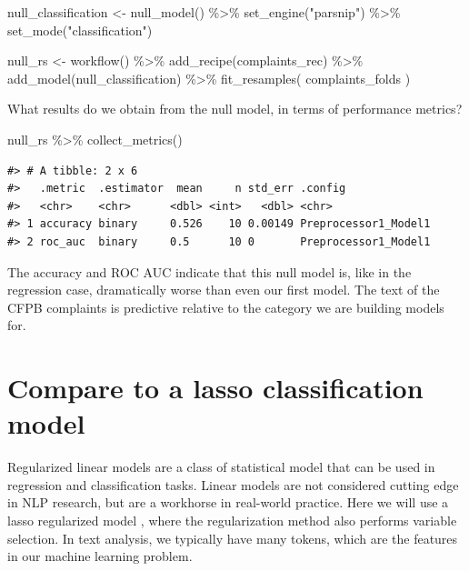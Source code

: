 \documentclass[
]{krantz}
\makeatletter
\newenvironment{Shaded}{\begin{snugshade}}{\end{snugshade}}
\newcommand{\FunctionTok}[1]{\textcolor[rgb]{0.00,0.00,0.00}{#1}}
\newcommand{\NormalTok}[1]{#1}
\newcommand{\OtherTok}[1]{\textcolor[rgb]{0.56,0.35,0.01}{#1}}
\newcommand{\SpecialCharTok}[1]{\textcolor[rgb]{0.00,0.00,0.00}{#1}}
\newcommand{\StringTok}[1]{\textcolor[rgb]{0.31,0.60,0.02}{#1}}
\newenvironment{kframe}{%
\medskip{}
\setlength{\fboxsep}{.8em}
 \def\at@end@of@kframe{}%
 \ifinner\ifhmode%
  \def\at@end@of@kframe{\end{minipage}}%
  \begin{minipage}{\columnwidth}%
 \fi\fi%
 \def\FrameCommand##1{\hskip\@totalleftmargin \hskip-\fboxsep
 \colorbox{shadecolor}{##1}\hskip-\fboxsep
     \hskip-\linewidth \hskip-\@totalleftmargin \hskip\columnwidth}%
 \MakeFramed {\advance\hsize-\width
   \@totalleftmargin\z@ \linewidth\hsize
   \@setminipage}}%
 {\par\unskip\endMakeFramed%
 \at@end@of@kframe}
\renewenvironment{Shaded}{\begin{kframe}}{\end{kframe}}
\makeatother
\begin{document}
\begin{Shaded}
\begin{Highlighting}[]
\NormalTok{null\_classification }\OtherTok{\textless{}{-}} \FunctionTok{null\_model}\NormalTok{() }\SpecialCharTok{\%\textgreater{}\%}
  \FunctionTok{set\_engine}\NormalTok{(}\StringTok{"parsnip"}\NormalTok{) }\SpecialCharTok{\%\textgreater{}\%}
  \FunctionTok{set\_mode}\NormalTok{(}\StringTok{"classification"}\NormalTok{)}

\NormalTok{null\_rs }\OtherTok{\textless{}{-}} \FunctionTok{workflow}\NormalTok{() }\SpecialCharTok{\%\textgreater{}\%}
  \FunctionTok{add\_recipe}\NormalTok{(complaints\_rec) }\SpecialCharTok{\%\textgreater{}\%}
  \FunctionTok{add\_model}\NormalTok{(null\_classification) }\SpecialCharTok{\%\textgreater{}\%}
  \FunctionTok{fit\_resamples}\NormalTok{(}
\NormalTok{    complaints\_folds}
\NormalTok{  )}
\end{Highlighting}
\end{Shaded}

What results do we obtain from the null model, in terms of performance metrics?

\begin{Shaded}
\begin{Highlighting}[]
\NormalTok{null\_rs }\SpecialCharTok{\%\textgreater{}\%}
  \FunctionTok{collect\_metrics}\NormalTok{()}
\end{Highlighting}
\end{Shaded}

\begin{verbatim}
#> # A tibble: 2 x 6
#>   .metric  .estimator  mean     n std_err .config             
#>   <chr>    <chr>      <dbl> <int>   <dbl> <chr>               
#> 1 accuracy binary     0.526    10 0.00149 Preprocessor1_Model1
#> 2 roc_auc  binary     0.5      10 0       Preprocessor1_Model1
\end{verbatim}

The accuracy and ROC AUC indicate that this null model is, like in the regression case, dramatically worse than even our first model. The text of the CFPB complaints is predictive relative to the category we are building models for.

\hypertarget{comparetolasso}{%
\section{Compare to a lasso classification model}\label{comparetolasso}}

Regularized linear models are a class of statistical model that can be used in regression and classification tasks. Linear models are not considered cutting edge in NLP research, but are a workhorse in real-world practice. Here we will use a lasso regularized model \citep{Tibshirani1996}, where the regularization method also performs variable selection. In text analysis, we typically have many tokens, which are the features in our machine learning problem.
\end{document}

